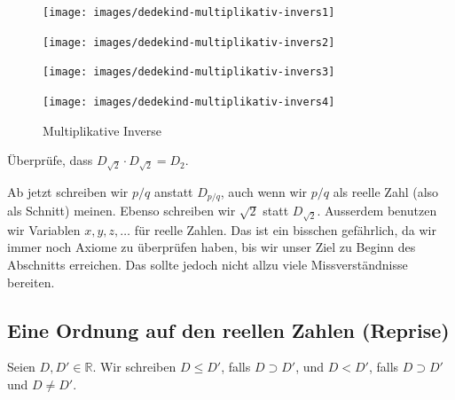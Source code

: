 \documentclass[../main.tex]{subfiles}
\begin{document}
\begin{figure}[htb]
  \centering
  \begin{minipage}{0.4\linewidth}
    \centering
    \texttt{[image: images/dedekind-multiplikativ-invers1]}
  \end{minipage}%
  \begin{minipage}{0.4\linewidth}
    \centering
    \texttt{[image: images/dedekind-multiplikativ-invers2]}
  \end{minipage}
  \begin{minipage}{0.4\linewidth}
    \centering
    \texttt{[image: images/dedekind-multiplikativ-invers3]}
  \end{minipage}%
  \begin{minipage}{0.4\linewidth}
    \centering
    \texttt{[image: images/dedekind-multiplikativ-invers4]}
  \end{minipage}%
  \caption{Multiplikative Inverse}%
  \label{fig:multiplikativ-dedekind}
\end{figure}

\begin{exercise}
  Überprüfe, dass $D_{\sqrt 2} \cdot D_{\sqrt 2} = D_{2}$.
\end{exercise}

\begin{remark}
  Ab jetzt schreiben wir $p/q$ anstatt $D_{p/q}$,
  auch wenn wir $p/q$ als reelle Zahl (also als Schnitt)
  meinen.
  Ebenso schreiben wir $\sqrt 2$ statt $D_{\sqrt 2}$.
  Ausserdem benutzen wir Variablen $x,y,z, \dots$
  für reelle Zahlen.
  Das ist ein bisschen gefährlich, da wir immer noch
  Axiome zu überprüfen haben, bis wir unser Ziel zu Beginn
  des Abschnitts erreichen. Das sollte jedoch nicht allzu
  viele Missverständnisse bereiten.
\end{remark}

\subsection*{Eine Ordnung auf den reellen Zahlen (Reprise)}
\begin{definition}
  Seien $D, D' \in \mathbb R$. Wir schreiben $D \leq D'$, falls
  $D \supset D'$, und $D < D'$, falls $D \supset D'$ und $D \neq D'$.
\end{definition}
\end{document}
